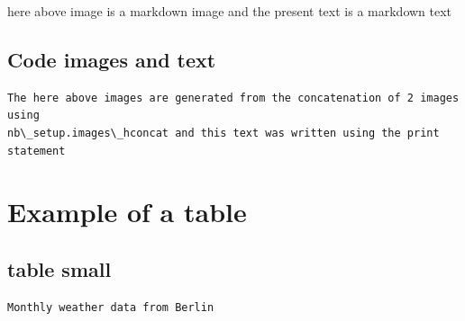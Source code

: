 \documentclass[reprint, floatfix, groupaddress, prb]{article}
\begin{document}
    
        
    \begin{figure}
        \begin{center}\end{center}
        \caption{}
        \label{}
    \end{figure}
    
    

    here above image is a markdown image and the present text is a markdown
text

    \hypertarget{code-images-and-text}{%
\subsection{Code images and text}\label{code-images-and-text}}

    
        
    \begin{figure}
        \begin{center}\end{center}
        \caption{}
        \label{}
    \end{figure}
    
    

    \begin{Verbatim}[commandchars=\\\{\}]
 The here above images are generated from the concatenation of 2 images using
nb\_setup.images\_hconcat and this text was written using the print statement
    \end{Verbatim}

    \hypertarget{example-of-a-table}{%
\section{Example of a table}\label{example-of-a-table}}

    \hypertarget{table-small}{%
\subsection{table small}\label{table-small}}

    \begin{Verbatim}[commandchars=\\\{\}]
Monthly weather data from Berlin
    \end{Verbatim}
\end{document}
